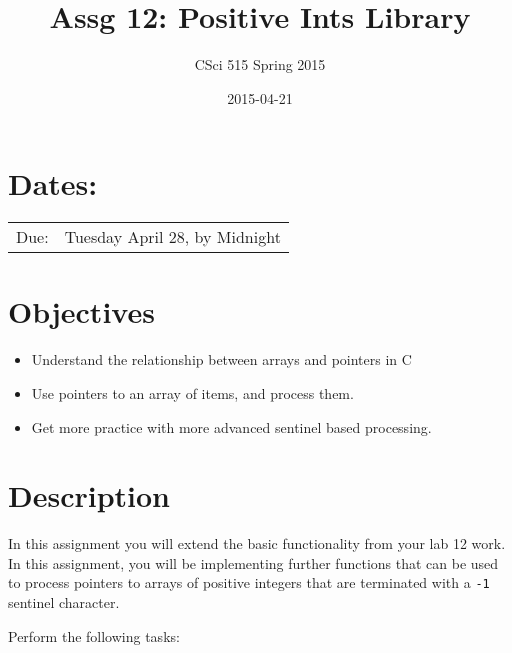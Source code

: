 \documentclass[11pt]{article}
\title{Assg 12: Positive Ints Library}
\author{CSci 515 Spring 2015}
\date{2015-04-21}
\begin{document}
\maketitle


\section*{Dates:}
\label{sec-1}


\begin{center}
\begin{tabular}{ll}
 Due:  &  Tuesday April 28, by Midnight  \\
\end{tabular}
\end{center}
\section*{Objectives}
\label{sec-2}

\begin{itemize}
\item Understand the relationship between arrays and pointers in C
\item Use pointers to an array of items, and process them.
\item Get more practice with more advanced sentinel based processing.
\end{itemize}
\section*{Description}
\label{sec-3}

In this assignment you will extend the basic functionality from your
lab 12 work.  In this assignment, you will be implementing further
functions that can be used to process pointers to arrays of
positive integers that are terminated with a \verb~-1~ sentinel
character.

Perform the following tasks:
\end{document}
